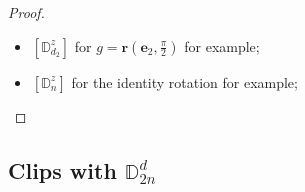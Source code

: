 \documentclass[11pt,a4paper]{amsart}
\theoremstyle{definition}
\newcommand{\ZZ}{\mathbb{Z}}                %
\newcommand{\OO}{\mathrm{O}}                %
\newcommand{\SO}{\mathrm{SO}}               %
\newcommand{\DD}{\mathbb{D}}                %
\newcommand{\1}{\mathds{1}}		            %
\newcommand{\ee}{\pmb{e}}                   %
\newcommand{\uu}{\pmb{u}}                   %
\newcommand{\vv}{\pmb{v}}                   %
\newcommand{\vR}{\mathbf{r}}
\newcommand{\be}{\mathbf{e}}
\newcommand{\set}[1]{\left\{#1\right\}}     %
\newcommand{\Dnz}{\DD_n^z}
\newcommand{\Dnd}{\DD_{2n}^d}
\begin{document}
\begin{proof}
\begin{itemize}
		\item $[\DD_{d_2}^z]$ for $g=\vR\left(\ee_2,\frac{\pi}{2}\right)$ for example;
		\item $[\DD_n^z]$ for the identity rotation for example;
	\end{itemize}

\end{proof}


\subsection{Clips with $\Dnd$}
\end{document}
